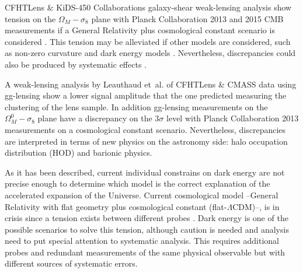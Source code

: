 CFHTLens \& KiDS-450 Collaborations galaxy-shear weak-lensing analysis show tension on the $\Omega_M-\sigma_8$ plane with Planck Collaboration 2013 \cite{2014A&A...571A..16P} and 2015 CMB measurements if a General Relativity plus cosmological constant scenario is considered \cite{2013MNRAS.430.2200K,2017arXiv170303383H}. This tension may be alleviated if other models are considered, such as non-zero curvature and dark energy models \cite{2016arXiv161004606J}. Nevertheless, discrepancies could also be produced by systematic effects \cite{2015PhRvD..92b3003D,2017MNRAS.465.2033J}.
\newline

A weak-lensing analysis by Leauthaud et~al. \cite{2017MNRAS.467.3024L} of CFHTLens \& CMASS data using gg-lensing show a lower signal amplitude that the one predicted measuring the clustering of the lens sample. In addition gg-lensing measurements on the $\Omega_M^0-\sigma_8$ plane have a discrepancy on the $3\sigma$ level with Planck Collaboration 2013 measurements on a cosmological constant scenario. Nevertheless, discrepancies are interpreted in terms of new physics on the astronomy side: halo occupation distribution (HOD) and barionic physics.
\newline

As it has been described, current individual constrains on dark energy are not precise enough to determine which model is the correct explanation of the accelerated expansion of the Universe. Current cosmological model --General Relativity with flat geometry plus cosmological constant (flat-$\Lambda$CDM)--, is in crisis since a tension exists between different probes \cite{2016PDU....12...56B}. Dark energy is one of the possible scenarios to solve this tension, although caution is needed and analysis need to put special attention to systematic analysis. This requires additional probes and redundant measurements of the same physical observable but with different sources of systematic errors.


